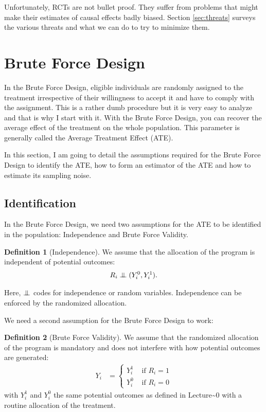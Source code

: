 \documentclass[
]{book}
\newcommand\Ind{\protect\mathpalette{\protect\independenT}{\perp}}
\def\independenT#1#2{\mathrel{\setbox0\hbox{$#1#2$}\copy0\kern-\wd0\mkern4mu\box0}}
\theoremstyle{definition}
\newtheorem{definition}{Definition}[chapter]
\theoremstyle{definition}
\theoremstyle{definition}
\theoremstyle{definition}
\theoremstyle{remark}
\begin{document}
Unfortunately, RCTs are not bullet proof.
They suffer from problems that might make their estimates of causal effects badly biased.
Section \ref{sec:threats} surveys the various threats and what we can do to try to minimize them.

\hypertarget{sec:design1}{%
\section{Brute Force Design}\label{sec:design1}}

In the Brute Force Design, eligible individuals are randomly assigned to the treatment irrespective of their willingness to accept it and have to comply with the assignment.
This is a rather dumb procedure but it is very easy to analyze and that is why I start with it.
With the Brute Force Design, you can recover the average effect of the treatment on the whole population.
This parameter is generally called the Average Treatment Effect (ATE).

In this section, I am going to detail the assumptions required for the Brute Force Design to identify the ATE, how to form an estimator of the ATE and how to estimate its sampling noise.

\hypertarget{identification}{%
\subsection{Identification}\label{identification}}

In the Brute Force Design, we need two assumptions for the ATE to be identified in the population: Independence and Brute Force Validity.

\begin{definition}[Independence]
\protect\hypertarget{def:independence}{}{\label{def:independence} \iffalse (Independence) \fi{} }We assume that the allocation of the program is independent of potential outcomes:
\begin{align*}
  R_i\Ind(Y_i^0,Y_i^1).
\end{align*}
\end{definition}

Here, \(\Ind\) codes for independence or random variables.
Independence can be enforced by the randomized allocation.

We need a second assumption for the Brute Force Design to work:

\begin{definition}[Brute Force Validity]
\protect\hypertarget{def:BF}{}{\label{def:BF} \iffalse (Brute Force Validity) \fi{} }We assume that the randomized allocation of the program is mandatory and does not interfere with how potential outcomes are generated:
\begin{align*}
Y_i & = 
  \begin{cases}
    Y_i^1 & \text{ if } R_i=1  \\
    Y_i^0 & \text{ if } R_i=0      
  \end{cases}
\end{align*}
with \(Y_i^1\) and \(Y_i^0\) the same potential outcomes as defined in Lecture\textasciitilde0 with a routine allocation of the treatment.
\end{definition}
\end{document}
